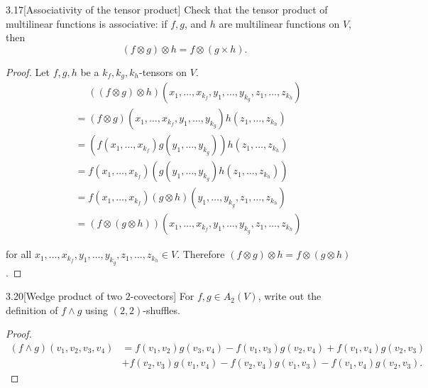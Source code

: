 \begin{exercise}{3.17}[Associativity of the tensor product]
	Check that the tensor product of multilinear functions is associative: if \( f, g \), and \( h \) are multilinear functions on \( V \), then
	\[
		(f \otimes g)\otimes h = f\otimes (g\times h).
	\]
\end{exercise}

\begin{proof}
	Let \( f, g, h \) be a \( k_{f}, k_{g}, k_{h} \)-tensors on \( V \).
	\begingroup
	\allowdisplaybreaks%
	\begin{align*}
		 & \phantom{=} ((f \otimes g) \otimes h)(x_{1}, \ldots, x_{k_{f}}, y_{1}, \ldots, y_{k_{g}}, z_{1}, \ldots, z_{k_{h}}) \\
		 & = (f \otimes g)(x_{1}, \ldots, x_{k_{f}}, y_{1}, \ldots, y_{k_{g}}) h(z_{1}, \ldots, z_{k_{h}})                     \\
		 & = (f(x_{1}, \ldots, x_{k_{f}}) g(y_{1}, \ldots, y_{k_{g}}))  h(z_{1}, \ldots, z_{k_{h}})                            \\
		 & = f(x_{1}, \ldots, x_{k_{f}}) (g(y_{1}, \ldots, y_{k_{g}}) h(z_{1}, \ldots, z_{k_{h}}))                             \\
		 & = f(x_{1}, \ldots, x_{k_{f}}) (g \otimes h)(y_{1}, \ldots, y_{k_{g}}, z_{1}, \ldots, z_{k_{h}})                     \\
		 & = (f \otimes (g \otimes h))(x_{1}, \ldots, x_{k_{f}}, y_{1}, \ldots, y_{k_{g}}, z_{1}, \ldots, z_{k_{h}})
	\end{align*}
	\endgroup

	for all \( x_{1}, \ldots, x_{k_{f}}, y_{1}, \ldots, y_{k_{g}}, z_{1}, \ldots, z_{k_{h}} \in V \). Therefore \( (f\otimes g)\otimes h = f\otimes (g\otimes h) \).
\end{proof}

\begin{exercise}{3.20}[Wedge product of two \( 2 \)-covectors]
	For \( f, g \in A_{2}(V) \), write out the definition of \( f \wedge g \) using \( (2, 2) \)-shuffles.
\end{exercise}

\begin{proof}
	\begingroup
	\allowdisplaybreaks%
	\begin{align*}
		(f \wedge g)(v_{1}, v_{2}, v_{3}, v_{4}) & = f(v_{1}, v_{2})g(v_{3}, v_{4}) - f(v_{1}, v_{3})g(v_{2}, v_{4}) + f(v_{1}, v_{4})g(v_{2}, v_{3})  \\
		                                         & + f(v_{2}, v_{3})g(v_{1}, v_{4}) - f(v_{2}, v_{4})g(v_{1}, v_{3}) - f(v_{1}, v_{4})g(v_{2}, v_{3}).
	\end{align*}
	\endgroup
\end{proof}

